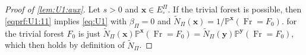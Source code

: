 \documentclass[reqno,draft]{amsart}
\numberwithin{equation}{section}
\theoremstyle{plain}
\theoremstyle{remark}
\renewcommand{\P}{\mathbb{P}} %
\newcommand*\diff{\mathop{}\!\mathrm{d}}
\newcommand{\fpart}{\Pi} %
\newcommand{\semi}{S}
\DeclareMathOperator{\fr}{Fr}
\newcommand{\nn}{\widetilde{N}} %
\begin{document}
\begin{proof}[Proof of \cref{lem:U1:aux}]
    Let $s > 0$ and $\boldsymbol x\in E^\fpart_\circ $.
    If the trivial forest is possible, then \cref{eqprf:U1:11} implies \cref{eq:U1} with $\beta_\fpart = 0$ and $\nn_\fpart(\boldsymbol x) = 1 / \P^{\boldsymbol x}(\fr = F_0)$. %
     for the trivial forest $F_0$ is just $\nn_\fpart(\boldsymbol x) \P^{\boldsymbol x}(\fr = F_0) = \nn_\fpart(\boldsymbol y) \P^{\boldsymbol y}(\fr = F_0)$, which then holds by definition of $\nn_\fpart$.


\end{proof}
\end{document}
